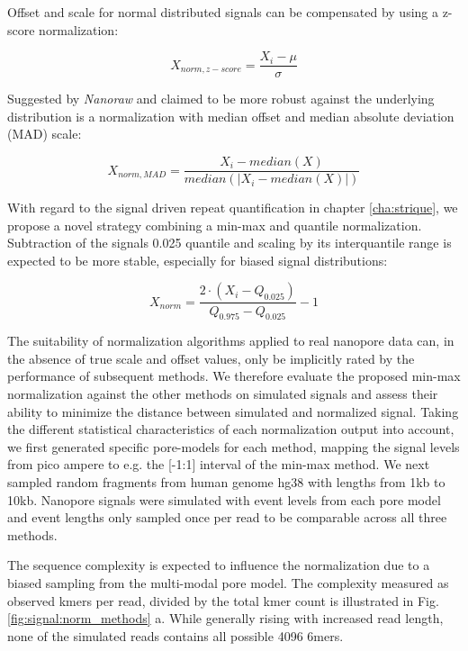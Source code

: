 Offset and scale for normal distributed signals can be compensated by using a z-score normalization:

\begin{equation}
	X_{norm,z-score} = \frac{X_{i} - \mu}{\sigma}
\end{equation}

Suggested by \textit{Nanoraw} \cite{Stoiber2017} and claimed to be more robust against the underlying distribution is a normalization with median offset and median absolute deviation (MAD) scale:

\begin{equation}
	X_{norm,MAD} = \frac{X_{i} - median(X)}{median(\left|X_{i}-median(X)\right|)}
\end{equation}

With regard to the signal driven repeat quantification in chapter \ref{cha:strique}, we propose a novel strategy combining a min-max and quantile normalization. Subtraction of the signals 0.025 quantile and scaling by its interquantile range is expected to be more stable, especially for biased signal distributions:

\begin{equation}
	X_{norm} = \frac{2 \cdot (X_{i} - Q_{0.025})}{Q_{0.975} - Q_{0.025}} - 1
\end{equation}

The suitability of normalization algorithms applied to real nanopore data can, in the absence of true scale and offset values, only be implicitly rated by the performance of subsequent methods. We therefore evaluate the proposed min-max normalization against the other methods on simulated signals and assess their ability to minimize the distance between simulated and normalized signal. Taking the different statistical characteristics of each normalization output into account, we first generated specific pore-models for each method, mapping the signal levels from pico ampere to e.g. the [-1:1] interval of the min-max method. We next sampled random fragments from human genome hg38 with lengths from 1kb to 10kb. Nanopore signals were simulated with event levels from each pore model and event lengths only sampled once per read to be comparable across all three methods. 

The sequence complexity is expected to influence the normalization due to a biased sampling from the multi-modal pore model. The complexity measured as observed kmers per read, divided by the total kmer count is illustrated in Fig. \ref{fig:signal:norm_methods} a. While generally rising with increased read length, none of the simulated reads contains all possible 4096 6mers.

